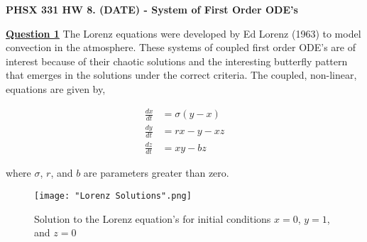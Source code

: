 \documentclass{article}
\begin{document}
 
\textbf{\Large{PHSX 331 HW 8. (DATE) - System of First Order ODE's}}
 
\hrulefill
 
\textbf{\underline{Question 1}} 
The Lorenz equations were developed by Ed Lorenz (1963) to model convection in the atmosphere. These systems of coupled first order ODE's are of interest because of their chaotic solutions and the interesting butterfly pattern that emerges in the solutions under the correct criteria. The coupled, non-linear, equations are given by,

 
\begin{align}
	 \frac{dx}{dt} &= \sigma (y - x) \\
	 \frac{dy}{dt} &= rx - y - xz \\
	 \frac{dz}{dt} &= xy - bz
\end{align}

where $\sigma$, $r$, and $b$ are parameters greater than zero.
\begin{figure}[H]
	\texttt{[image: "Lorenz Solutions".png]}
	\caption{Solution to the Lorenz equation's for initial conditions $x = 0$, $y = 1$, and $z = 0$}
\end{figure}
\end{document}
